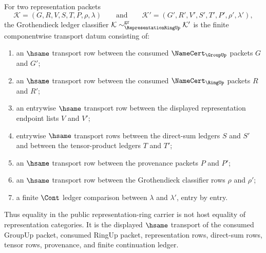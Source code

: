 \begin{definition}
\label{def:representationring-grothendieck-ledger-classifier}
For two representation packets
$$
\mathcal{K}=(G,R,V,S,T,P,\rho,\lambda)
\qquad\text{and}\qquad
\mathcal{K}'=(G',R',V',S',T',P',\rho',\lambda'),
$$
the Grothendieck ledger classifier
$\mathcal{K}\sim_{\RepresentationRingUp}^{\mathrm{gr}}\mathcal{K}'$
is the finite componentwise transport datum consisting of:
\begin{enumerate}
  \item an $\hsame$ transport row between the consumed $\NameCert_{\GroupUp}$
  packets $G$ and $G'$;
  \item an $\hsame$ transport row between the consumed $\NameCert_{\RingUp}$
  packets $R$ and $R'$;
  \item an entrywise $\hsame$ transport row between the displayed
  representation endpoint lists $V$ and $V'$;
  \item entrywise $\hsame$ transport rows between the direct-sum ledgers $S$
  and $S'$ and between the tensor-product ledgers $T$ and $T'$;
  \item an $\hsame$ transport row between the provenance packets $P$ and
  $P'$;
  \item an $\hsame$ transport row between the Grothendieck classifier rows
  $\rho$ and $\rho'$;
  \item a finite $\Cont$ ledger comparison between $\lambda$ and $\lambda'$,
  entry by entry.
\end{enumerate}
Thus equality in the public representation-ring carrier is not host equality
of representation categories. It is the displayed $\hsame$ transport of the
consumed GroupUp packet, consumed RingUp packet, representation rows,
direct-sum rows, tensor rows, provenance, and finite continuation ledger.
\end{definition}

